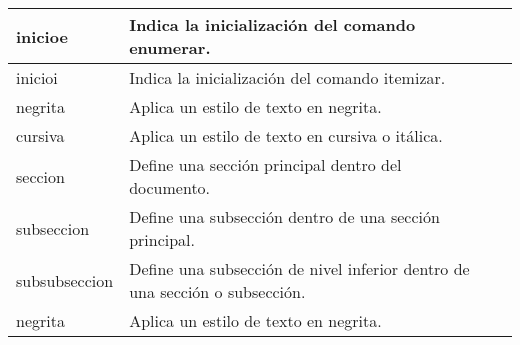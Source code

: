 \documentclass[12pt]{article}
\begin{document}
\begin{enumerate}
\begin{itemize}
\begin{tabular}{ |p{6cm}||p{8cm}|p{3cm}|p{3cm}|  }
            \hline inicioe & Indica la inicialización del comando enumerar. \\
            \hline inicioi & Indica la inicialización del comando itemizar. \\
            \hline negrita & Aplica un estilo de texto en negrita.\\
            \hline cursiva & Aplica un estilo de texto en cursiva o itálica.\\
            \hline seccion & Define una sección principal dentro del documento.\\
            \hline subseccion & Define una subsección dentro de una sección principal.\\
            \hline subsubseccion & Define una subsección de nivel inferior dentro de una sección o subsección.\\
            \hline negrita & Aplica un estilo de texto en negrita.\\
            \hline
            \end{tabular}
        

\end{itemize}
\end{enumerate}
\end{document}
